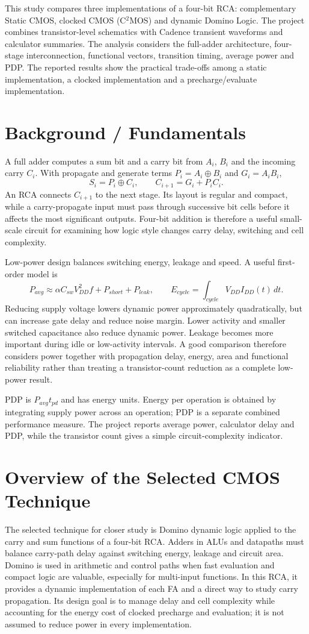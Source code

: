 \documentclass[11pt,a4paper]{article}
\begin{document}
This study compares three implementations of a four-bit RCA: complementary Static CMOS, clocked CMOS (C$^{2}$MOS) and dynamic Domino Logic. The project combines transistor-level schematics with Cadence transient waveforms and calculator summaries. The analysis considers the full-adder architecture, four-stage interconnection, functional vectors, transition timing, average power and PDP. The reported results show the practical trade-offs among a static implementation, a clocked implementation and a precharge/evaluate implementation.

\section{Background / Fundamentals}
A full adder computes a sum bit and a carry bit from $A_i$, $B_i$ and the incoming carry $C_i$. With propagate and generate terms $P_i=A_i\oplus B_i$ and $G_i=A_iB_i$,
\[
S_i=P_i\oplus C_i,\qquad C_{i+1}=G_i+P_iC_i.
\]
An RCA connects $C_{i+1}$ to the next stage. Its layout is regular and compact, while a carry-propagate input must pass through successive bit cells before it affects the most significant outputs. Four-bit addition is therefore a useful small-scale circuit for examining how logic style changes carry delay, switching and cell complexity.

Low-power design balances switching energy, leakage and speed. A useful first-order model is
\[
P_{avg}\approx \alpha C_{sw}V_{DD}^{2}f+P_{short}+P_{leak},\qquad
E_{cycle}=\int_{cycle} V_{DD}I_{DD}(t)\,dt.
\]
Reducing supply voltage lowers dynamic power approximately quadratically, but can increase gate delay and reduce noise margin. Lower activity and smaller switched capacitance also reduce dynamic power. Leakage becomes more important during idle or low-activity intervals. A good comparison therefore considers power together with propagation delay, energy, area and functional reliability rather than treating a transistor-count reduction as a complete low-power result.

PDP is $P_{avg}t_{pd}$ and has energy units. Energy per operation is obtained by integrating supply power across an operation; PDP is a separate combined performance measure. The project reports average power, calculator delay and PDP, while the transistor count gives a simple circuit-complexity indicator.

\section{Overview of the Selected CMOS Technique}
The selected technique for closer study is Domino dynamic logic applied to the carry and sum functions of a four-bit RCA. Adders in ALUs and datapaths must balance carry-path delay against switching energy, leakage and circuit area. Domino is used in arithmetic and control paths when fast evaluation and compact logic are valuable, especially for multi-input functions. In this RCA, it provides a dynamic implementation of each FA and a direct way to study carry propagation. Its design goal is to manage delay and cell complexity while accounting for the energy cost of clocked precharge and evaluation; it is not assumed to reduce power in every implementation.
\end{document}
